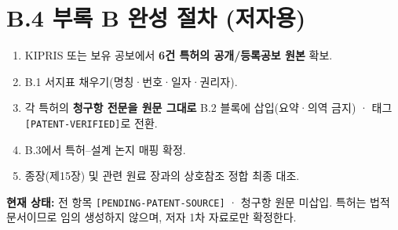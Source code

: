 \documentclass[12pt,oneside]{book}
\newenvironment{authnote}
  {\par\smallskip\begingroup\leftskip=6mm\rightskip=3mm\small\color{muted}\noindent\ignorespaces}
  {\par\endgroup\smallskip}
\begin{document}
\vspace{2pt}\vspace{3pt}

\section{B.4 부록 B 완성 절차 (저자용)}

\begin{enumerate}[leftmargin=6mm,itemsep=1pt,topsep=2pt]
  \item KIPRIS 또는 보유 공보에서 \textbf{6건 특허의 공개/등록공보 원본} 확보.
  \item B.1 서지표 채우기(명칭·번호·일자·권리자).
  \item 각 특허의 \textbf{청구항 전문을 원문 그대로} B.2 블록에 삽입(요약·의역 금지) · 태그 \texttt{[PATENT-VERIFIED]}로 전환.
  \item B.3에서 특허–설계 논지 매핑 확정.
  \item 종장(제15장) 및 관련 원료 장과의 상호참조 정합 최종 대조.
\end{enumerate}

\begin{authnote}\textbf{현재 상태:} 전 항목 \texttt{[PENDING-PATENT-SOURCE]} · 청구항 원문 미삽입. 특허는 법적 문서이므로 임의 생성하지 않으며, 저자 1차 자료로만 확정한다.\end{authnote}
\end{document}
